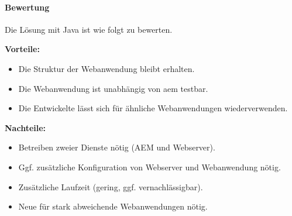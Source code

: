 \paragraph{Bewertung}

Die Lösung mit Java ist wie folgt zu bewerten.

\begin{minipage}[t]{0.5\textwidth}
	\textbf{Vorteile:}
	\begin{itemize}
		\item Die Struktur der Webanwendung bleibt erhalten.
		\item Die Webanwendung ist unabhängig von \ac{aem} testbar.
		\item Die Entwickelte \ajc lässt sich für ähnliche Webanwendungen wiederverwenden.
	\end{itemize}
\end{minipage}
\begin{minipage}[t]{0.5\textwidth}
	\textbf{Nachteile:}
	\begin{itemize}
		\item Betreiben zweier Dienste nötig (AEM und Webserver).
		\item Ggf. zusätzliche Konfiguration von Webserver und Webanwendung nötig.
		\item Zusätzliche Laufzeit (gering, ggf. vernachlässigbar).
		\item Neue \ajc für stark abweichende Webanwendungen nötig.
	\end{itemize}
\end{minipage}